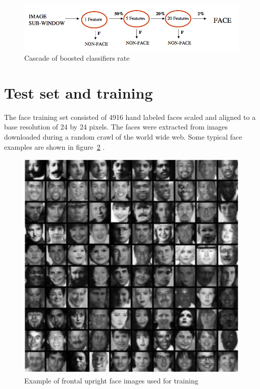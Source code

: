 \begin{figure}[!h]
\begin{center}
\noindent \includegraphics[scale=0.5]{figures/haar_feature_cascade_rate} 
\newline
\caption{Cascade of boosted classifiers rate}
\label{haar_feature_cascade_rate}
\end{center} 
\end{figure}

\section{Test set and training}

\vspace{\baselineskip}
\noindent The face training set consisted of 4916 hand labeled faces scaled and aligned to a base resolution of 24 by 24 pixels. The faces were extracted from images downloaded during a random crawl of the world wide web. Some typical face examples are shown in figure~\ref{haar_feature_training_dataset} \cite{VIO01}.
\newline

\begin{figure}[!h]
\begin{center}
\noindent \includegraphics[scale=0.9]{figures/haar_feature_training_dataset} 
\newline
\caption{Example of frontal upright face images used for training}
\label{haar_feature_training_dataset}
\end{center} 
\end{figure}

